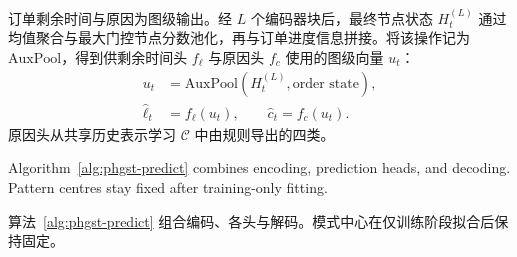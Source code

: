 \documentclass[a4paper,fleqn]{cas-dc}
\newcommand{\zhpara}[1]{%
  \par\begingroup\small\color{black!72}\noindent #1\par\endgroup}
\begin{document}
\zhpara{订单剩余时间与原因为图级输出。经 $L$ 个编码器块后，最终节点状态 $H_t^{(L)}$ 通过均值聚合与最大门控节点分数池化，再与订单进度信息拼接。将该操作记为 $\mathrm{AuxPool}$，得到供剩余时间头 $f_\ell$ 与原因头 $f_c$ 使用的图级向量 $u_t$：
\begin{equation}
\begin{aligned}
u_t&=\mathrm{AuxPool}(H_t^{(L)},\text{order state}),\\
\hat\ell_t&=f_\ell(u_t),\qquad \hat c_t=f_c(u_t).
\end{aligned}
\end{equation}
原因头从共享历史表示学习 $\mathcal{C}$ 中由规则导出的四类。}


Algorithm~\ref{alg:phgst-predict} combines encoding, prediction heads, and decoding. Pattern centres stay fixed after training-only fitting.

\zhpara{算法~\ref{alg:phgst-predict} 组合编码、各头与解码。模式中心在仅训练阶段拟合后保持固定。}
\end{document}
